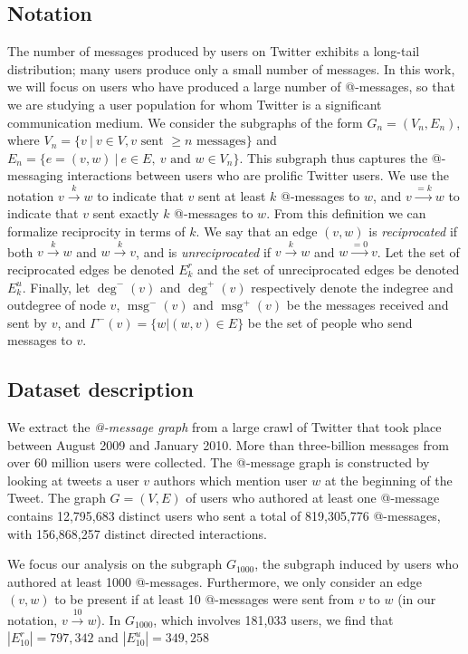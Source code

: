 \documentclass[conference]{IEEEtran}
\begin{document}
\subsection{Notation}
The number of messages produced by users on 
Twitter exhibits a long-tail distribution; many users produce only a small number of messages.
In this work, we will focus on users who have produced 
a large number of @-messages, so that we are studying 
a user population for whom Twitter is a significant communication medium.
We consider the subgraphs of the form $G_n = (V_n, E_n)$, where $V_n = \{v~|~v \in V, v \text{ sent } \ge n \text{ messages}\}$ and $E_n = \{e=(v,w)~|~e \in E,~v \text{ and } w \in V_n\}$.
This subgraph thus captures the @-messaging interactions between users who are prolific Twitter users.
We use the notation $v \xrightarrow{k} w$ to indicate that $v$ sent at least $k$ @-messages to $w$, and $v \xrightarrow{=k} w$ to indicate that $v$ sent exactly $k$ @-messages to $w$. 
From this definition we can formalize reciprocity in terms of $k$. 
We say that an edge $(v,w)$ is {\em reciprocated} 
if both $v \xrightarrow{k} w$ and $w \xrightarrow{k} v$, and 
is {\em unreciprocated} if $v \xrightarrow{k} w$ and $w \xrightarrow{=0} v$.
Let the set of reciprocated edges be denoted $E_k^r$
and the set of unreciprocated edges be denoted $E_k^u$.
Finally, let $\deg^-(v)$ and $\deg^+(v)$ respectively denote the indegree and outdegree of node $v$, $\operatorname{msg}^-(v)$ and $\operatorname{msg}^+(v)$ be the messages received and sent by $v$, and $\Gamma^-(v) = \{w| (w,v) \in E\}$ be the set of people who send messages to $v$.

\subsection{Dataset description}
We extract the \emph{@-message graph} from a large crawl of Twitter that took place between August 2009 and January 2010.
More than three-billion messages from over 60 million users were collected.  
The @-message graph is constructed by looking at tweets a user $v$ authors which mention user $w$ at the beginning of the Tweet.  
The graph $G = (V,E)$ of users who authored at least one @-message 
contains 12,795,683 distinct users who sent a total 
of 819,305,776 @-messages, with 156,868,257 distinct directed interactions. 

We focus our analysis on the subgraph $G_{1000}$, the subgraph induced by users who authored at least 1000 @-messages. 
Furthermore, we only consider an edge $(v,w)$ to be present if at least 10 @-messages were sent from $v$ to $w$ (in our notation, $v \xrightarrow{10} w$).
In $G_{1000}$, which involves 181,033 users, we find that $|E^r_{10}| = 797,342$ and $|E^u_{10}| = 349,258$
\end{document}
